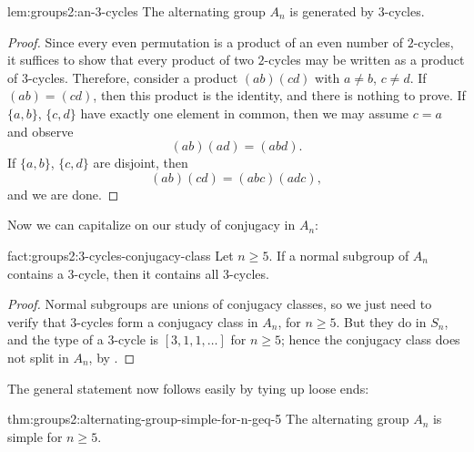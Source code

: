 \begin{lem}{}{lem:groups2:an-3-cycles}
  The alternating group $A_n$ is generated by $3$-cycles.
\end{lem}

\begin{proof}
  Since every even permutation is a product of an even number of
  $2$-cycles, it suffices to show that every product of two $2$-cycles
  may be written as a product of $3$-cycles. Therefore, consider a
  product $(ab)(cd)$ with $a \neq b$, $c \neq d$. If $(ab) = (cd)$,
  then this product is the identity, and there is nothing to prove. If
  $\{a,b\}$, $\{c,d\}$ have exactly one element in common, then we may
  assume $c = a$ and observe
  \[
    (ab)(ad) = (abd).
  \]
  If $\{a,b\}$, $\{c,d\}$ are disjoint, then
  \[
    (ab)(cd) = (abc)(adc),
  \]
  and we are done.
\end{proof}
Now we can capitalize on our study of conjugacy in $A_n$:

\begin{fact}{}{fact:groups2:3-cycles-conjugacy-class}
  Let $n \geq 5$. If a normal subgroup of $A_n$ contains a $3$-cycle,
  then it contains all $3$-cycles.
\end{fact}

\begin{proof}
  Normal subgroups are unions of conjugacy classes, so we just need to
  verify that $3$-cycles form a conjugacy class in $A_n$, for
  $n \geq 5$. But they do in $S_n$, and the type of a $3$-cycle is
  $[3,1,1,\dots]$ for $n \geq 5$; hence the conjugacy class does not
  split in $A_n$, by .
\end{proof}
The general statement now follows easily by tying up loose ends:

\begin{thm}{}{thm:groups2:alternating-group-simple-for-n-geq-5}
  The alternating group $A_n$ is simple for $n \geq 5$.
\end{thm}

